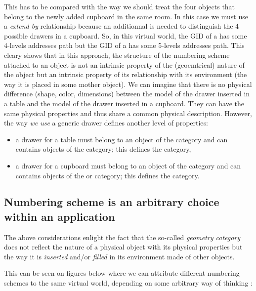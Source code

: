\pn This  has to  be compared with  the way  we should treat  the four
 objects that belong  to the newly added cupboard in
the  same  room.  In  this   case  we  must  use  a  \emph{extend  by}
relationship because  an additionnal   is needed to
distinguish the 4 possible drawers  in a cupboard. So, in this virtual
world,  the GID of  a   has some  4-levels addresses
path but the  GID of a  has  some 5-levels addresses
path. This  cleary shows that in  this approach, the  structure of the
numbering scheme attached to an object is not an intrinsic property of
the (geoemtrical)  nature of the  object but an intrinsic  property of
its relationship  with its environment (the  way it is  placed in some
mother object).  We can imagine  that there is no  physical difference
(shape, color, dimensions) between the model of the drawer inserted in
a table and  the model of the drawer inserted in  a cupboard. They can
have the  same physical  properties and thus  share a  common physical
description. However, the way \emph{we  use} a generic drawer 
defines another level of properties:
\begin{itemize}
\item a drawer for a table  must belong to an object of the 
  category and can contains  objects of the  category; this
  defines the  category,
\item  a  drawer for  a  cupboard  must belong  to  an  object of  the
   category  and can  contains objects of  the 
  or  category; this defines the  category.
\end{itemize}

\subsection{Numbering scheme is an arbitrary choice within an application}

\pn  The above  considerations  enlight the  fact  that the  so-called
\emph{geometry  category} does not  reflect the  nature of  a physical
object with its physical properties  but the way it is \emph{inserted}
and/or \emph{filled} in its environment made of other objects.

\pn This can be seen on figures below where we can attribute different
numbering  schemes  to  the  same  virtual world,  depending  on  some
arbitrary way of thinking :

